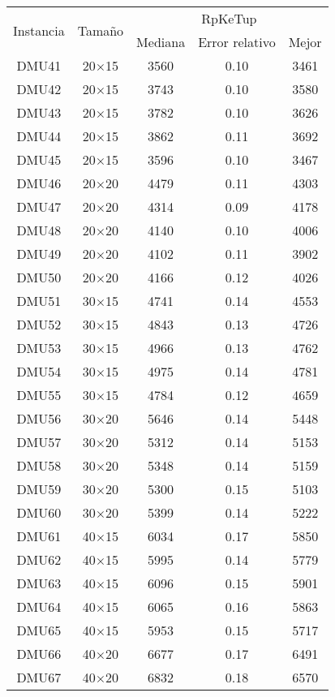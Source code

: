 \begin{table}[H]
\centering
\begin{tabular}{@{}ccccc@{}}
\toprule
\multirow{2}{*}{Instancia} & \multirow{2}{*}{Tamaño} & \multicolumn{3}{c}{RpKeTup} \\ \cmidrule(lr){3-5}
& & Mediana& Error relativo & Mejor  \\ \midrule
DMU41 & 20$\times$15 & 3560 & 0.10 & 3461\\ 
DMU42 & 20$\times$15 & 3743 & 0.10 & 3580\\ 
DMU43 & 20$\times$15 & 3782 & 0.10 & 3626\\ 
DMU44 & 20$\times$15 & 3862 & 0.11 & 3692\\ 
DMU45 & 20$\times$15 & 3596 & 0.10 & 3467\\ 
DMU46 & 20$\times$20 & 4479 & 0.11 & 4303\\ 
DMU47 & 20$\times$20 & 4314 & 0.09 & 4178\\ 
DMU48 & 20$\times$20 & 4140 & 0.10 & 4006\\ 
DMU49 & 20$\times$20 & 4102 & 0.11 & 3902\\ 
DMU50 & 20$\times$20 & 4166 & 0.12 & 4026\\ 
DMU51 & 30$\times$15 & 4741 & 0.14 & 4553\\ 
DMU52 & 30$\times$15 & 4843 & 0.13 & 4726\\ 
DMU53 & 30$\times$15 & 4966 & 0.13 & 4762\\ 
DMU54 & 30$\times$15 & 4975 & 0.14 & 4781\\ 
DMU55 & 30$\times$15 & 4784 & 0.12 & 4659\\ 
DMU56 & 30$\times$20 & 5646 & 0.14 & 5448\\ 
DMU57 & 30$\times$20 & 5312 & 0.14 & 5153\\ 
DMU58 & 30$\times$20 & 5348 & 0.14 & 5159\\ 
DMU59 & 30$\times$20 & 5300 & 0.15 & 5103\\ 
DMU60 & 30$\times$20 & 5399 & 0.14 & 5222\\ 
DMU61 & 40$\times$15 & 6034 & 0.17 & 5850\\ 
DMU62 & 40$\times$15 & 5995 & 0.14 & 5779\\ 
DMU63 & 40$\times$15 & 6096 & 0.15 & 5901\\ 
DMU64 & 40$\times$15 & 6065 & 0.16 & 5863\\ 
DMU65 & 40$\times$15 & 5953 & 0.15 & 5717\\ 
DMU66 & 40$\times$20 & 6677 & 0.17 & 6491\\ 
DMU67 & 40$\times$20 & 6832 & 0.18 & 6570\\ 

\end{tabular}
\end{table}
